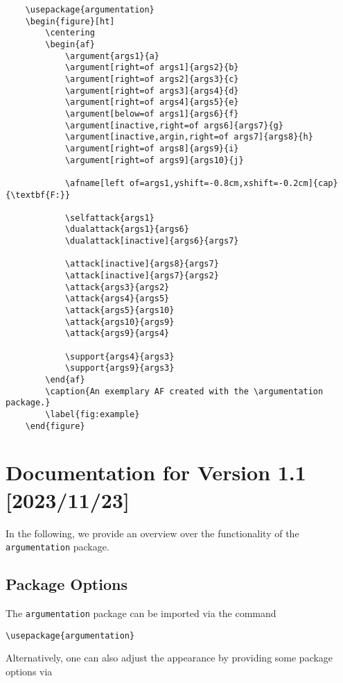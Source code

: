 \documentclass{article}
\newcommand{\argumentation}{\texttt{argumentation}\xspace}
\begin{document}
\begin{verbatim}
    \usepackage{argumentation}
    \begin{figure}[ht]
        \centering
        \begin{af}
            \argument{args1}{a}
            \argument[right=of args1]{args2}{b}
            \argument[right=of args2]{args3}{c}
            \argument[right=of args3]{args4}{d}
            \argument[right=of args4]{args5}{e}
            \argument[below=of args1]{args6}{f}
            \argument[inactive,right=of args6]{args7}{g}
            \argument[inactive,argin,right=of args7]{args8}{h}
            \argument[right=of args8]{args9}{i}
            \argument[right=of args9]{args10}{j}
    
            \afname[left of=args1,yshift=-0.8cm,xshift=-0.2cm]{cap}{\textbf{F:}}
    
            \selfattack{args1}
            \dualattack{args1}{args6}
            \dualattack[inactive]{args6}{args7}
            
            \attack[inactive]{args8}{args7}
            \attack[inactive]{args7}{args2}
            \attack{args3}{args2}    
            \attack{args4}{args5}
            \attack{args5}{args10}
            \attack{args10}{args9}
            \attack{args9}{args4}

            \support{args4}{args3}
            \support{args9}{args3}
        \end{af}
        \caption{An exemplary AF created with the \argumentation package.}
        \label{fig:example}
    \end{figure}
\end{verbatim}

\section{Documentation for Version 1.1 [2023/11/23]}
In the following, we provide an overview over the functionality of the \argumentation package.

\subsection{Package Options}
    The \argumentation package can be imported via the command
    
    \noindent
    \verb|\usepackage{argumentation}|

    Alternatively, one can also adjust the appearance by providing some package options via
\end{document}
